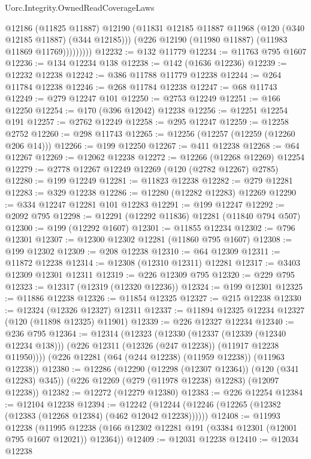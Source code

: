 \begin{lexlean}{Uorc.Integrity.OwnedReadCoverageLaws}
\begin{coremodule}
                  @12186
                  (@11825 @11887)
                  @12190
                  (@11831 @12185 @11887 @11968 (@120 (@340 @12185 @11887) (@344 @12185)))
                  (@226 @12190 (@11980 @11887) (@11983 @11869 @11769)))))))))
@12232 := @132 @11779
@12234 := @11763 @795 @1607
@12236 := @134 @12234 @138
@12238 := @142 (@1636 @12236)
@12239 := @12232 @12238
@12242 := @386 @11788 @11779 @12238
@12244 := @264 @11784 @12238
@12246 := @268 @11784 @12238
@12247 := @68 @11743
@12249 := @279 @12247 @101
@12250 := @2753 @12249
@12251 := @166 @12250
@12254 := @170 (@396 @12042) @12238
@12256 := @12251 @12254 @191
@12257 := @2762 @12249
@12258 := @295 @12247
@12259 := @12258 @2752
@12260 := @298 @11743
@12265 := @12256 (@12257 (@12259 (@12260 @206 @14)))
@12266 := @199 @12250
@12267 := @411 @12238
@12268 := @64 @12267
@12269 := @12062 @12238
@12272 := @12266 (@12268 @12269) @12254
@12279 := @2778 @12267 @12249 @12269 (@120 (@2782 @12267) @2785)
@12280 := @199 @12249
@12281 := @11823 @12238
@12282 := @279 @12281
@12283 := @329 @12238
@12286 := @12280 (@12282 @12283) @12269
@12290 := @334 @12247 @12281 @101 @12283
@12291 := @199 @12247
@12292 := @2092 @795
@12298 := @12291 (@12292 @11836) @12281 (@11840 @794 @507)
@12300 := @199 (@12292 @1607)
@12301 := @11855 @12234
@12302 := @796 @12301
@12307 := @12300 @12302 @12281 (@11860 @795 @1607)
@12308 := @199 @12302
@12309 := @208 @12238
@12310 := @64 @12309
@12311 := @11872 @12238
@12314 := @12308 (@12310 @12311) @12281
@12317 := @3403 @12309 @12301 @12311
@12319 := @226 @12309 @795
@12320 := @229 @795
@12323 := @12317 (@12319 (@12320 @12236))
@12324 := @199 @12301
@12325 := @11886 @12238
@12326 := @11854 @12325
@12327 := @215 @12238
@12330 := @12324 (@12326 @12327) @12311
@12337 := @11894 @12325 @12234 @12327 (@120 (@11898 @12325) @11901)
@12339 := @226 @12327 @12234
@12340 := @236 @795
@12364 := @12314
    (@12323
      (@12330
        (@12337 (@12339 (@12340 @12234 @138)))
        (@226 @12311 (@12326 (@247 @12238)) (@11917 @12238 @11950))))
    (@226 @12281 (@64 (@244 @12238) (@11959 @12238)) (@11963 @12238))
@12380 := @12286
    (@12290 (@12298 (@12307 @12364)) (@120 (@341 @12283) @345))
    (@226 @12269 (@279 (@11978 @12238) @12283) (@12097 @12238))
@12382 := @12272 (@12279 @12380)
@12383 := @226 @12254
@12384 := @12104 @12238
@12394 := @12242 (@12244 (@12246 (@12265 (@12382 (@12383 (@12268 @12384) (@462 @12042 @12238))))))
@12408 := @11993
    @12238
    (@11995 @12238 (@166 @12302 @12281 @191 (@3384 @12301 (@12001 @795 @1607 @12021)) @12364))
@12409 := @12031 @12238
@12410 := @12034 @12238

\end{coremodule}
\end{lexlean}
